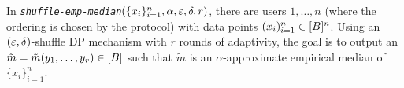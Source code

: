 \begin{definition}\label{def:med-emp-shuffle}
In \emph{\texttt{shuffle-emp-median}}$(\{x_i\}_{i=1}^n,\alpha,\varepsilon,\delta,r)$, there are users $1,\dots, n$ (where the ordering is chosen by the protocol) with data points $(x_i)_{i=1}^n\in [B]^n$. Using an $(\varepsilon,\delta)$-shuffle DP mechanism with $r$ rounds of adaptivity, the goal is to output an $\tilde m=\tilde m(y_1,\dots, y_r)\in [B]$ such that $\tilde m$ is an $\alpha$-approximate empirical median of $\{x_i\}_{i=1}^n$.
\end{definition}

